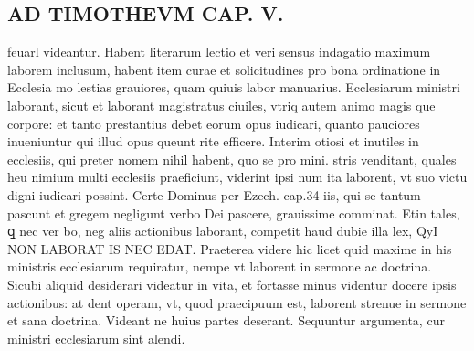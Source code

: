 \documentclass{article}
\begin{document}
\begin{pages}
\section*{AD TIMOTHEVM CAP. V. }
\marginpar{[ p.113 ]}\pstart feuarl videantur. Habent literarum lectio et veri sensus indagatio maximum laborem inclusum, habent item curae et solicitudines pro bona ordinatione in Ecclesia mo lestias grauiores, quam quiuis labor manuarius. Ecclesiarum ministri laborant, sicut et laborant magistratus ciuiles, vtriq autem animo magis que corpore: et tanto prestantius debet eorum opus iudicari, quanto pauciores inueniuntur qui illud opus queunt rite efficere. Interim otiosi et inutiles in ecclesiis, qui preter nomem nihil habent, quo se pro mini. stris venditant, quales heu nimium multi ecclesiis praeficiunt, viderint ipsi num ita laborent, vt suo victu digni iudicari possint. Certe Dominus per Ezech. cap.34-iis, qui se tantum pascunt et gregem negligunt verbo Dei pascere, grauissime comminat. Etin tales, ꝗ nec ver bo, neg aliis actionibus laborant, competit haud dubie illa lex, QyI NON LABORAT IS NEC EDAT. Praeterea videre hic licet quid maxime in his ministris ecclesiarum requiratur, nempe vt laborent in sermone ac doctrina. Sicubi aliquid desiderari videatur in vita, et fortasse minus videntur docere ipsis actionibus: at dent operam, vt, quod praecipuum est, laborent strenue in sermone et sana doctrina. Videant ne huius partes deserant. Sequuntur argumenta, cur ministri ecclesiarum sint alendi.  \pend
{}
{}

\end{pages}
\end{document}
